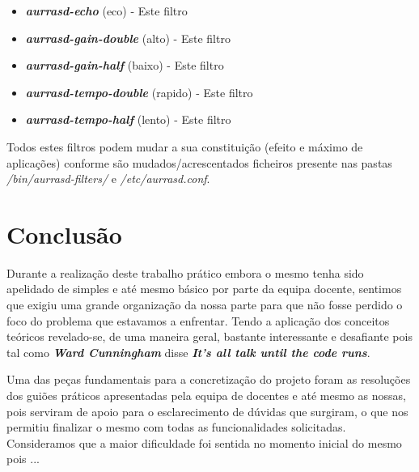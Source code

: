 \documentclass[11pt,a4paper]{report}
\begin{document}
\begin{itemize}
\item \emph{\textbf{aurrasd-echo}} (eco) - Este filtro
\item \emph{\textbf{aurrasd-gain-double}} (alto) - Este filtro
\item \emph{\textbf{aurrasd-gain-half}} (baixo) - Este filtro
\item \emph{\textbf{aurrasd-tempo-double}} (rapido) - Este filtro
\item \emph{\textbf{aurrasd-tempo-half}} (lento) - Este filtro
\end{itemize}

Todos estes filtros podem mudar a sua constituição (efeito e máximo de aplicações) conforme são mudados/acrescentados ficheiros presente nas pastas \emph{/bin/aurrasd-filters/} e \emph{/etc/aurrasd.conf}.

\chapter{Conclusão}

Durante a realização deste trabalho prático embora o mesmo tenha sido apelidado de simples e até mesmo básico por parte da equipa docente, sentimos que exigiu uma grande organização da nossa parte para que não fosse perdido o foco do problema que estavamos a enfrentar. Tendo a aplicação dos conceitos teóricos revelado-se, de uma maneira geral, bastante interessante e desafiante pois tal como \emph{\textbf{Ward Cunningham}} disse \emph{\textbf{It's all talk until the code runs}}. 

Uma das peças fundamentais para a concretização do projeto foram as resoluções dos guiões práticos apresentadas pela equipa de docentes e até mesmo as nossas, pois serviram de apoio para o esclarecimento de dúvidas que surgiram, o que nos permitiu finalizar o mesmo com todas as funcionalidades solicitadas. Consideramos que a maior dificuldade foi sentida no momento inicial do mesmo pois ...
\end{document}
